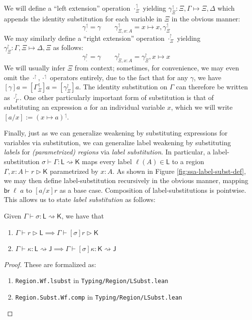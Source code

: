\documentclass[acmsmall,screen,review]{acmart}
\newcommand{\ms}[1]{\ensuremath{\mathsf{#1}}}
\newcommand{\rupg}[1]{{#1}^\upharpoonright}
\newcommand{\lupg}[1]{{#1}^\upharpoonleft}
\newcommand{\bhyp}[2]{#1 : #2}
\newcommand{\haslb}[3]{#1 \vdash #2 \rhd #3}
\newcommand{\issubst}[3]{#1: #2 \mapsto #3}
\newcommand{\lbsubst}[4]{#1 \vdash #2: #3 \rightsquigarrow #4}
\begin{document}
We will define a ``left extension'' operation $\lupg{\cdot}_\Xi$ yielding
$\issubst{\lupg{\gamma}_{\Xi}}{\Xi, \Gamma}{\Xi, \Delta}$ which appends the identity substitution
for each variable in $\Xi$ in the obvious manner:
\begin{equation}
  \lupg{\gamma}_{\cdot} = \gamma \qquad 
  \lupg{\gamma}_{\Xi, \bhyp{x}{A}} = x \mapsto x, \lupg{\gamma}_{\Xi}
\end{equation}
We may similarly define a ``right extension'' operation $\rupg{\cdot}_\Xi$ yielding
$\issubst{\rupg{\gamma}_{\Xi}}{\Gamma, \Xi}{\Delta, \Xi}$ as follows:
\begin{equation}
  \rupg{\gamma}_{\cdot} = \gamma \qquad 
  \rupg{\gamma}_{\Xi, \bhyp{x}{A}} = \rupg{\gamma}_{\Xi}, x \mapsto x
\end{equation}
We will usually infer $\Xi$ from context; sometimes, for convenience, we may even omit the
$\rupg{\cdot}, \lupg{\cdot}$ operators entirely, due to the fact that for any $\gamma$, we have
$[\gamma]a = [\lupg{\Gamma}_\Xi]a = [\rupg{\gamma}_\Xi]a$. The identity substitution on $\Gamma$ can
therefore be written as $\rupg{\cdot}_{\Gamma}$. One other particularly important form of
substitution is that of substituting an expression $a$ for an individual variable $x$, which we will
write $[a/x] := \lupg{(x \mapsto a)}$.

Finally, just as we can generalize weakening by substituting expressions for variables via
substitution, we can generalize label weakening by substituting \emph{labels} for
\emph{(parametrized) regions} via \emph{label substitution}. In particular, a label-substitution
$\lbsubst{\sigma}{\Gamma}{\ms{L}}{\ms{K}}$ maps every label $\ell(A) \in \ms{L}$ to a region
$\haslb{\Gamma, x : A}{r}{\ms{K}}$ parametrized by $x : A$. As shown in Figure
\ref{fig:ssa-label-subst-def}, we may then define label-substitution recursively in the obvious
manner, mapping $\ms{br}\;\ell\;a$ to $[a/x]r$ as a base case. Composition of label-substitutions is
pointwise. This allows us to state \emph{label substitution} as follows:

\begin{lemma}
  Given $\lbsubst{\Gamma}{\sigma}{\ms{L}}{\ms{K}}$, we have that
  \begin{enumerate}[label=(\alph*)]
    \item $\haslb{\Gamma}{r}{\ms{L}} \implies \haslb{\Gamma}{[\sigma]r}{\ms{K}}$
    \item $\lbsubst{\Gamma}{\kappa}{\ms{L}}{\ms{J}} 
      \implies \lbsubst{\Gamma}{[\sigma]\kappa}{\ms{K}}{\ms{J}}$
  \end{enumerate}
\end{lemma}
\begin{proof}
  These are formalized as:
  \begin{enumerate}[label=(\alph*)]
    \item \texttt{Region.Wf.lsubst} in \texttt{Typing/Region/LSubst.lean}
    \item \texttt{Region.Subst.Wf.comp} in \texttt{Typing/Region/LSubst.lean}
  \end{enumerate}
\end{proof}
\end{document}
